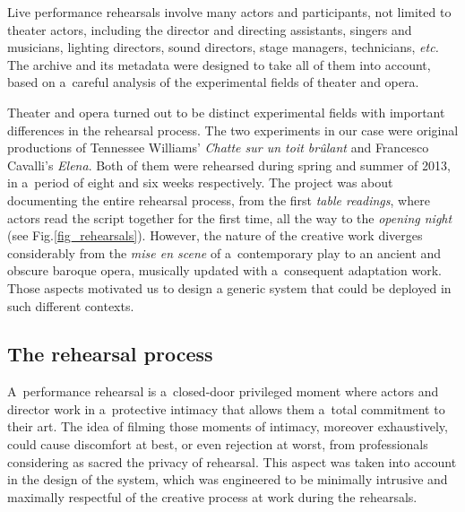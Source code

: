 \documentclass[conference]{IEEEtran}
\newcommand{\todo}[1]{\noindent\textcolor{red}{{\bf \{ToDo} #1{\bf \}}}}
\begin{document}
Live performance rehearsals involve many actors and participants, not limited to theater actors,  including the director and  directing assistants, singers and musicians, lighting directors, sound directors, stage managers, technicians, \emph{etc.} The archive and its metadata were designed to take all of them into account, based on a~careful analysis of the experimental fields of  theater and opera.



Theater and opera turned out to be distinct experimental fields with important differences in the rehearsal process.  The two experiments in our case were original productions of  Tennessee Williams' \emph{Chatte sur un toit brûlant} and Francesco Cavalli's \emph{Elena}. Both of them  were rehearsed during spring and summer of 2013, in a~period of eight and six weeks respectively. The project was about documenting the entire rehearsal process, from the first \emph{table readings}, where actors read the script together for the first time, all the way to the \emph{opening night} (see Fig.\ref{fig_rehearsals}). However, the nature of the creative work diverges considerably from the \emph{mise en scene} of a~contemporary play to an ancient and obscure baroque opera, musically updated with a~consequent adaptation work. Those aspects motivated us to design  
a generic system that could be deployed in such different contexts.

\subsection{The rehearsal process}

A~performance rehearsal is a~closed-door privileged moment where actors and director work in a~protective intimacy that allows them a~total commitment to their art. The idea of filming those moments of intimacy, moreover exhaustively, could cause discomfort at best, or even rejection at worst, from professionals considering as sacred the privacy of rehearsal. This aspect was taken into account in the design of the system, 
which was engineered to be minimally intrusive and maximally respectful of  the creative process at work
during the rehearsals.
\end{document}
